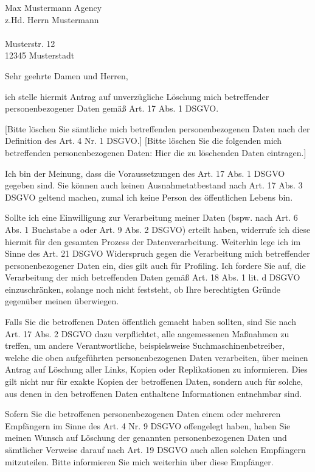 \documentclass[a4paper, pagenumber=footmiddle, parskip=half,
	foldmarks=true,foldmarks=BmT,
	fromalign=right,  %
	fromphone=false, fromfax=false, fromemail=true, fromurl=true, fromlogo=true,
	fromrule=false, version=last]{scrlttr2}
\begin{document}
\begin{letter}{
	Max Mustermann Agency\\ 
	z.Hd. Herrn Mustermann\\ \ \\
	Musterstr. 12\\
	12345 Musterstadt
}
\flushleft
\opening{Sehr geehrte Damen und Herren,}

ich stelle hiermit Antrag auf unverzügliche Löschung mich betreffender personenbezogener Daten gemäß Art. 17 Abs. 1 DSGVO.

[Bitte löschen Sie sämtliche mich betreffenden personenbezogenen Daten nach der Definition des Art. 4 Nr. 1 DSGVO.]
[Bitte löschen Sie die folgenden mich betreffenden personenbezogenen Daten:
Hier die zu löschenden Daten eintragen.]

Ich bin der Meinung, dass die Voraussetzungen des Art. 17 Abs. 1 DSGVO gegeben sind. Sie können auch keinen Ausnahmetatbestand nach Art. 17 Abs. 3 DSGVO geltend machen, zumal ich keine Person des öffentlichen Lebens bin.

Sollte ich eine Einwilligung zur Verarbeitung meiner Daten (bspw. nach Art. 6 Abs. 1 Buchstabe a oder Art. 9 Abs. 2 DSGVO) erteilt haben, widerrufe ich diese hiermit für den gesamten Prozess der Datenverarbeitung.
Weiterhin lege ich im Sinne des Art. 21 DSGVO Widerspruch gegen die Verarbeitung mich betreffender personenbezogener Daten ein, dies gilt auch für Profiling. Ich fordere Sie auf, die Verarbeitung der mich betreffenden Daten gemäß Art. 18 Abs. 1 lit. d DSGVO einzuschränken, solange noch nicht feststeht, ob Ihre berechtigten Gründe gegenüber meinen überwiegen.

Falls Sie die betroffenen Daten öffentlich gemacht haben sollten, sind Sie nach Art. 17 Abs. 2 DSGVO dazu verpflichtet, alle angemessenen Maßnahmen zu treffen, um andere Verantwortliche, beispielsweise Suchmaschinenbetreiber, welche die oben aufgeführten personenbezogenen Daten verarbeiten, über meinen Antrag auf Löschung aller Links, Kopien oder Replikationen zu informieren. Dies gilt nicht nur für exakte Kopien der betroffenen Daten, sondern auch für solche, aus denen in den betroffenen Daten enthaltene Informationen entnehmbar sind.

Sofern Sie die betroffenen personenbezogenen Daten einem oder mehreren Empfängern im Sinne des Art. 4 Nr. 9 DSGVO offengelegt haben, haben Sie meinen Wunsch auf Löschung der genannten personenbezogenen Daten und sämtlicher Verweise darauf nach Art. 19 DSGVO auch allen solchen Empfängern mitzuteilen. Bitte informieren Sie mich weiterhin über diese Empfänger.


\end{letter}
\end{document}

